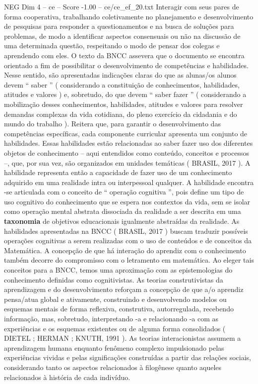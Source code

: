 \begin{textsample}{NEG Dim 4 – ce – Score -1.00 – ce/ce\_ef\_20.txt}
Interagir com seus pares de forma cooperativa, trabalhando coletivamente no planejamento e desenvolvimento de pesquisas para responder a questionamentos e na busca de soluções para problemas, de modo a identificar aspectos consensuais ou não na discussão de uma determinada questão, respeitando o modo de pensar dos colegas e aprendendo com eles.
O texto da BNCC assevera que o documento se encontra orientado a fim de possibilitar o desenvolvimento de competências e habilidades.
Nesse sentido, são apresentadas indicações claras do que as alunas/os alunos devem “ saber ” ( considerando a constituição de conhecimentos, habilidades, atitudes e valores ) e, sobretudo, do que devem “ saber fazer ” ( considerando a mobilização desses conhecimentos, habilidades, atitudes e valores para resolver demandas complexas da vida cotidiana, do pleno exercício da cidadania e do mundo do trabalho ).
Reitera que, para garantir o desenvolvimento das competências específicas, cada componente curricular apresenta um conjunto de habilidades.
Essas habilidades estão relacionadas ao saber fazer uso dos diferentes objetos de conhecimento – aqui entendidos como conteúdo, conceitos e processos –, que, por sua vez, são organizados em unidades temáticas ( BRASIL, 2017 ).
A habilidade representa então a capacidade de fazer uso de um conhecimento adquirido em uma realidade intra ou interpessoal qualquer.
A habilidade encontra -se articulada com o conceito de “ operação cognitiva ”, pois define um tipo de uso cognitivo do conhecimento que se espera nos contextos da vida, sem se isolar como operação mental abstrata dissociada da realidade a ser descrita em uma \textbf{taxonomia} de objetivos educacionais igualmente abstraídas da realidade.
As habilidades apresentadas na BNCC ( BRASIL, 2017 ) buscam traduzir possíveis operações cognitivas a serem realizadas com o uso de conteúdos e de conceitos da Matemática.
A concepção de que há interação do aprendiz com o conhecimento também decorre do compromisso com o letramento em matemática.
Ao eleger tais conceitos para a BNCC, temos uma aproximação com as epistemologias do conhecimento definidas como cognitivistas.
As teorias construtivistas da aprendizagem e do desenvolvimento reforçam a concepção de que a/o aprendiz pensa/atua global e ativamente, construindo e desenvolvendo modelos ou esquemas mentais de forma reflexiva, construtiva, autorregulada, recebendo informação, mas, sobretudo, interpretando -a e relacionando -a com as experiências e os esquemas existentes ou de alguma forma consolidados ( DIETEL ; HERMAN ; KNUTH, 1991 ).
As teorias interacionistas assumem a aprendizagem humana enquanto fenômeno complexo impulsionado pelas experiências vividas e pelas significações construídas a partir das relações sociais, considerando tanto os aspectos relacionados à filogênese quanto aqueles relacionados à história de cada indivíduo.

\end{textsample}
